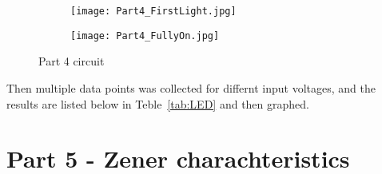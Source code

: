 \documentclass{article}
\begin{document}
\vspace{2em}


\begin{figure}[h]
    \centering
    \begin{subfigure}[t]{0.49\textwidth}
        \centering
        \texttt{[image: Part4\_FirstLight.jpg]}
        \label{fig:FirstLight}
    \end{subfigure}
    \hfill
    \begin{subfigure}[t]{0.49\textwidth}
        \centering
        \texttt{[image: Part4\_FullyOn.jpg]}
        \label{fig:Bright}
    \end{subfigure}
    \caption{Part 4 circuit}
    \label{fig:Part4States}
\end{figure}

Then multiple data points was collected for differnt input voltages, and the results are listed below in Teble~\ref{tab:LED} and then graphed.


\begin{table}[htbp]
  \centering
  \caption{LED values}
  \label{tab:LED}%
\end{table}



\section{Part 5 - Zener charachteristics}

\end{document}

